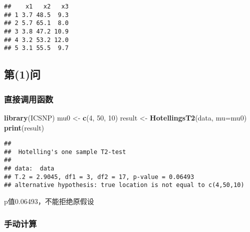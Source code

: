 \documentclass[
]{ctex}
\newenvironment{Shaded}{\begin{snugshade}}{\end{snugshade}}
\newcommand{\AttributeTok}[1]{\textcolor[rgb]{0.13,0.29,0.53}{#1}}
\newcommand{\DecValTok}[1]{\textcolor[rgb]{0.00,0.00,0.81}{#1}}
\newcommand{\FunctionTok}[1]{\textcolor[rgb]{0.13,0.29,0.53}{\textbf{#1}}}
\newcommand{\NormalTok}[1]{#1}
\newcommand{\OtherTok}[1]{\textcolor[rgb]{0.56,0.35,0.01}{#1}}
\begin{document}
\begin{verbatim}
##    x1   x2   x3
## 1 3.7 48.5  9.3
## 2 5.7 65.1  8.0
## 3 3.8 47.2 10.9
## 4 3.2 53.2 12.0
## 5 3.1 55.5  9.7
\end{verbatim}

\subsection{第(1)问}\label{ux7b2c1ux95ee}

\subsubsection{直接调用函数}\label{ux76f4ux63a5ux8c03ux7528ux51fdux6570}

\begin{Shaded}
\begin{Highlighting}[]
\FunctionTok{library}\NormalTok{(ICSNP)}
\NormalTok{mu0 }\OtherTok{\textless{}{-}} \FunctionTok{c}\NormalTok{(}\DecValTok{4}\NormalTok{, }\DecValTok{50}\NormalTok{, }\DecValTok{10}\NormalTok{)}
\NormalTok{result }\OtherTok{\textless{}{-}} \FunctionTok{HotellingsT2}\NormalTok{(data, }\AttributeTok{mu=}\NormalTok{mu0)}
\FunctionTok{print}\NormalTok{(result)}
\end{Highlighting}
\end{Shaded}

\begin{verbatim}
## 
##  Hotelling's one sample T2-test
## 
## data:  data
## T.2 = 2.9045, df1 = 3, df2 = 17, p-value = 0.06493
## alternative hypothesis: true location is not equal to c(4,50,10)
\end{verbatim}

p值0.06493，不能拒绝原假设

\subsubsection{手动计算}\label{ux624bux52a8ux8ba1ux7b97}
\end{document}
